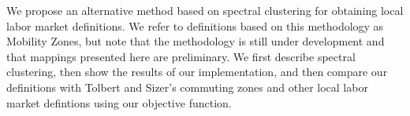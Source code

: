 We propose an alternative method based on spectral clustering for obtaining local labor market definitions. We refer to definitions based on this methodology as Mobility Zones, but note that the methodology is still under development and that mappings presented here are preliminary. We first describe spectral clustering, then show the results of our implementation, and then compare our definitions with Tolbert and Sizer's commuting zones and other local labor market defintions using our objective function.




